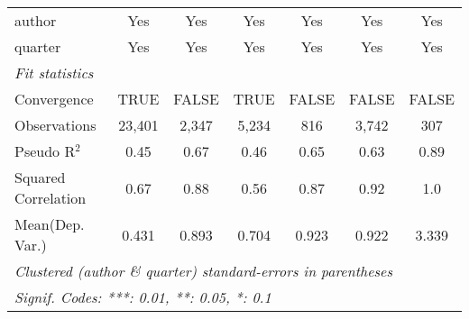 \begin{tabular}{lcccccc}
   author                                                     & Yes            & Yes           & Yes          & Yes           & Yes            & Yes\\  
   quarter                                                    & Yes            & Yes           & Yes          & Yes           & Yes            & Yes\\  
   \midrule
   \emph{Fit statistics}\\
   Convergence                                                &TRUE            & FALSE         & TRUE         & FALSE         & FALSE          & FALSE\\  
   Observations                                               & 23,401         & 2,347         & 5,234        & 816           & 3,742          & 307\\  
   Pseudo R$^2$                                               & 0.45           & 0.67          & 0.46         & 0.65          & 0.63           & 0.89\\  
   Squared Correlation                                        & 0.67           & 0.88          & 0.56         & 0.87          & 0.92           & 1.0\\  
Mean(Dep. Var.) & 0.431 & 0.893 & 0.704 & 0.923 & 0.922 & 3.339 \\
   \midrule \midrule
   \multicolumn{7}{l}{\emph{Clustered (author \& quarter) standard-errors in parentheses}}\\
   \multicolumn{7}{l}{\emph{Signif. Codes: ***: 0.01, **: 0.05, *: 0.1}}\\
\end{tabular}
\par\endgroup
